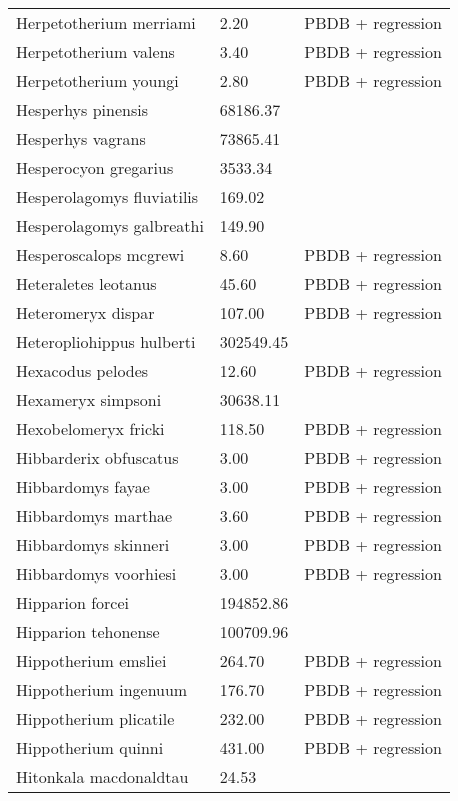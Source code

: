 \documentclass{article}
\begin{document}
\begin{center}
\begin{longtable}{p{} p{} p{}}
    Herpetotherium merriami & 2.20 & PBDB + regression \\ 
    Herpetotherium valens & 3.40 & PBDB + regression \\ 
    Herpetotherium youngi & 2.80 & PBDB + regression \\ 
    Hesperhys pinensis & 68186.37 & \cite{Tomiya2013} \\ 
    Hesperhys vagrans & 73865.41 & \cite{Tomiya2013} \\ 
    Hesperocyon gregarius & 3533.34 & \cite{Tomiya2013} \\ 
    Hesperolagomys fluviatilis & 169.02 & \cite{Tomiya2013} \\ 
    Hesperolagomys galbreathi & 149.90 & \cite{Tomiya2013} \\ 
    Hesperoscalops mcgrewi & 8.60 & PBDB + regression \\ 
    Heteraletes leotanus & 45.60 & PBDB + regression \\ 
    Heteromeryx dispar & 107.00 & PBDB + regression \\ 
    Heteropliohippus hulberti & 302549.45 & \cite{Tomiya2013} \\ 
    Hexacodus pelodes & 12.60 & PBDB + regression \\ 
    Hexameryx simpsoni & 30638.11 & \cite{Tomiya2013} \\ 
    Hexobelomeryx fricki & 118.50 & PBDB + regression \\ 
    Hibbarderix obfuscatus & 3.00 & PBDB + regression \\ 
    Hibbardomys fayae & 3.00 & PBDB + regression \\ 
    Hibbardomys marthae & 3.60 & PBDB + regression \\ 
    Hibbardomys skinneri & 3.00 & PBDB + regression \\ 
    Hibbardomys voorhiesi & 3.00 & PBDB + regression \\ 
    Hipparion forcei & 194852.86 & \cite{Tomiya2013} \\ 
    Hipparion tehonense & 100709.96 & \cite{Tomiya2013} \\ 
    Hippotherium emsliei & 264.70 & PBDB + regression \\ 
    Hippotherium ingenuum & 176.70 & PBDB + regression \\ 
    Hippotherium plicatile & 232.00 & PBDB + regression \\ 
    Hippotherium quinni & 431.00 & PBDB + regression \\ 
    Hitonkala macdonaldtau & 24.53 & \cite{Tomiya2013} \\ 

\end{longtable}
\end{center}
\end{document}
